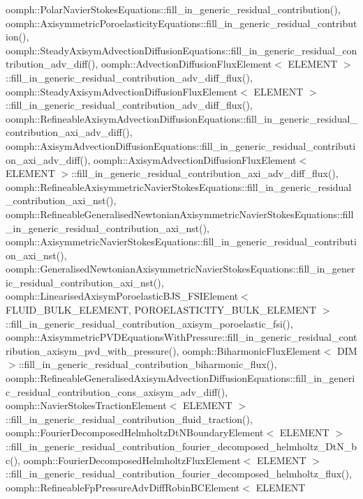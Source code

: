 oomph\+::\+Polar\+Navier\+Stokes\+Equations\+::fill\+\_\+in\+\_\+generic\+\_\+residual\+\_\+contribution(), oomph\+::\+Axisymmetric\+Poroelasticity\+Equations\+::fill\+\_\+in\+\_\+generic\+\_\+residual\+\_\+contribution(), oomph\+::\+Steady\+Axisym\+Advection\+Diffusion\+Equations\+::fill\+\_\+in\+\_\+generic\+\_\+residual\+\_\+contribution\+\_\+adv\+\_\+diff(), oomph\+::\+Advection\+Diffusion\+Flux\+Element$<$ E\+L\+E\+M\+E\+N\+T $>$\+::fill\+\_\+in\+\_\+generic\+\_\+residual\+\_\+contribution\+\_\+adv\+\_\+diff\+\_\+flux(), oomph\+::\+Steady\+Axisym\+Advection\+Diffusion\+Flux\+Element$<$ E\+L\+E\+M\+E\+N\+T $>$\+::fill\+\_\+in\+\_\+generic\+\_\+residual\+\_\+contribution\+\_\+adv\+\_\+diff\+\_\+flux(), oomph\+::\+Refineable\+Axisym\+Advection\+Diffusion\+Equations\+::fill\+\_\+in\+\_\+generic\+\_\+residual\+\_\+contribution\+\_\+axi\+\_\+adv\+\_\+diff(), oomph\+::\+Axisym\+Advection\+Diffusion\+Equations\+::fill\+\_\+in\+\_\+generic\+\_\+residual\+\_\+contribution\+\_\+axi\+\_\+adv\+\_\+diff(), oomph\+::\+Axisym\+Advection\+Diffusion\+Flux\+Element$<$ E\+L\+E\+M\+E\+N\+T $>$\+::fill\+\_\+in\+\_\+generic\+\_\+residual\+\_\+contribution\+\_\+axi\+\_\+adv\+\_\+diff\+\_\+flux(), oomph\+::\+Refineable\+Axisymmetric\+Navier\+Stokes\+Equations\+::fill\+\_\+in\+\_\+generic\+\_\+residual\+\_\+contribution\+\_\+axi\+\_\+nst(), oomph\+::\+Refineable\+Generalised\+Newtonian\+Axisymmetric\+Navier\+Stokes\+Equations\+::fill\+\_\+in\+\_\+generic\+\_\+residual\+\_\+contribution\+\_\+axi\+\_\+nst(), oomph\+::\+Axisymmetric\+Navier\+Stokes\+Equations\+::fill\+\_\+in\+\_\+generic\+\_\+residual\+\_\+contribution\+\_\+axi\+\_\+nst(), oomph\+::\+Generalised\+Newtonian\+Axisymmetric\+Navier\+Stokes\+Equations\+::fill\+\_\+in\+\_\+generic\+\_\+residual\+\_\+contribution\+\_\+axi\+\_\+nst(), oomph\+::\+Linearised\+Axisym\+Poroelastic\+B\+J\+S\+\_\+\+F\+S\+I\+Element$<$ F\+L\+U\+I\+D\+\_\+\+B\+U\+L\+K\+\_\+\+E\+L\+E\+M\+E\+N\+T, P\+O\+R\+O\+E\+L\+A\+S\+T\+I\+C\+I\+T\+Y\+\_\+\+B\+U\+L\+K\+\_\+\+E\+L\+E\+M\+E\+N\+T $>$\+::fill\+\_\+in\+\_\+generic\+\_\+residual\+\_\+contribution\+\_\+axisym\+\_\+poroelastic\+\_\+fsi(), oomph\+::\+Axisymmetric\+P\+V\+D\+Equations\+With\+Pressure\+::fill\+\_\+in\+\_\+generic\+\_\+residual\+\_\+contribution\+\_\+axisym\+\_\+pvd\+\_\+with\+\_\+pressure(), oomph\+::\+Biharmonic\+Flux\+Element$<$ D\+I\+M $>$\+::fill\+\_\+in\+\_\+generic\+\_\+residual\+\_\+contribution\+\_\+biharmonic\+\_\+flux(), oomph\+::\+Refineable\+Generalised\+Axisym\+Advection\+Diffusion\+Equations\+::fill\+\_\+in\+\_\+generic\+\_\+residual\+\_\+contribution\+\_\+cons\+\_\+axisym\+\_\+adv\+\_\+diff(), oomph\+::\+Navier\+Stokes\+Traction\+Element$<$ E\+L\+E\+M\+E\+N\+T $>$\+::fill\+\_\+in\+\_\+generic\+\_\+residual\+\_\+contribution\+\_\+fluid\+\_\+traction(), oomph\+::\+Fourier\+Decomposed\+Helmholtz\+Dt\+N\+Boundary\+Element$<$ E\+L\+E\+M\+E\+N\+T $>$\+::fill\+\_\+in\+\_\+generic\+\_\+residual\+\_\+contribution\+\_\+fourier\+\_\+decomposed\+\_\+helmholtz\+\_\+\+Dt\+N\+\_\+bc(), oomph\+::\+Fourier\+Decomposed\+Helmholtz\+Flux\+Element$<$ E\+L\+E\+M\+E\+N\+T $>$\+::fill\+\_\+in\+\_\+generic\+\_\+residual\+\_\+contribution\+\_\+fourier\+\_\+decomposed\+\_\+helmholtz\+\_\+flux(), oomph\+::\+Refineable\+Fp\+Pressure\+Adv\+Diff\+Robin\+B\+C\+Element$<$ E\+L\+E\+M\+E\+N\+T 